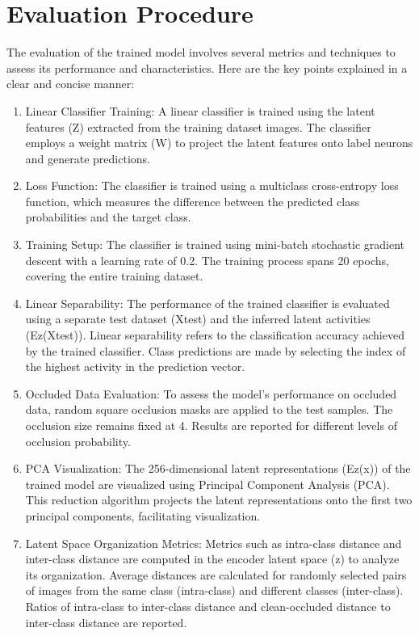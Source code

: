 \documentclass{midl} %
\begin{document}
\section{Evaluation Procedure}

The evaluation of the trained model involves several metrics and techniques to assess its performance and characteristics. Here are the key points explained in a clear and concise manner:

\begin{enumerate}
  \item Linear Classifier Training: A linear classifier is trained using the latent features (Z) extracted from the training dataset images. The classifier employs a weight matrix (W) to project the latent features onto label neurons and generate predictions.

  \item Loss Function: The classifier is trained using a multiclass cross-entropy loss function, which measures the difference between the predicted class probabilities and the target class.

   \item Training Setup: The classifier is trained using mini-batch stochastic gradient descent with a learning rate of 0.2. The training process spans 20 epochs, covering the entire training dataset.

  \item Linear Separability: The performance of the trained classifier is evaluated using a separate test dataset (Xtest) and the inferred latent activities (Ez(Xtest)). Linear separability refers to the classification accuracy achieved by the trained classifier. Class predictions are made by selecting the index of the highest activity in the prediction vector.

  \item Occluded Data Evaluation: To assess the model's performance on occluded data, random square occlusion masks are applied to the test samples. The occlusion size remains fixed at 4. Results are reported for different levels of occlusion probability.

  \item PCA Visualization: The 256-dimensional latent representations (Ez(x)) of the trained model are visualized using Principal Component Analysis (PCA). This reduction algorithm projects the latent representations onto the first two principal components, facilitating visualization.

  \item Latent Space Organization Metrics: Metrics such as intra-class distance and inter-class distance are computed in the encoder latent space (z) to analyze its organization. Average distances are calculated for randomly selected pairs of images from the same class (intra-class) and different classes (inter-class). Ratios of intra-class to inter-class distance and clean-occluded distance to inter-class distance are reported.


\end{enumerate}
\end{document}
